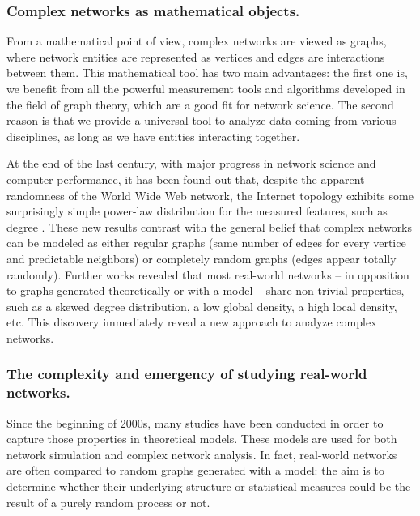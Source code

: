\documentclass[table]{report}
\begin{document}
\subsubsection{Complex networks as mathematical objects.}
\bigbreak

From a mathematical point of view, complex networks are viewed as graphs, where network entities are represented as vertices and edges are interactions between them. This mathematical tool has two main advantages: the first one is, we benefit from all the powerful measurement tools and algorithms developed in the field of graph theory, which are a good fit for network science. The second reason is that we provide a universal tool to analyze data coming from various disciplines, as long as we have entities interacting together.


At the end of the last century, with major progress in network science and computer performance, it has been found out that, despite the apparent randomness of the World Wide Web network, the Internet topology exhibits some surprisingly simple power-law distribution for the measured features, such as degree \cite{faloutsos}. These new results contrast with the general belief that complex networks can be modeled as either regular graphs (same number of edges for every vertice and predictable neighbors) or completely random graphs (edges appear totally randomly). Further works revealed that most real-world networks – in opposition to graphs generated theoretically or with a model – share non-trivial properties, such as a skewed degree distribution, a low global density, a high local density, etc. This discovery immediately reveal a new approach to analyze complex networks.

\medbreak

\subsubsection{The complexity and emergency of studying real-world networks.}
\medbreak

Since the beginning of 2000s, many studies have been conducted in order to capture those properties in theoretical models. These models are used for both network simulation and complex network analysis. In fact, real-world networks are often compared to random graphs generated with a model: the aim is to determine whether their underlying structure or statistical measures could be the result of a purely random process or not.
\end{document}
